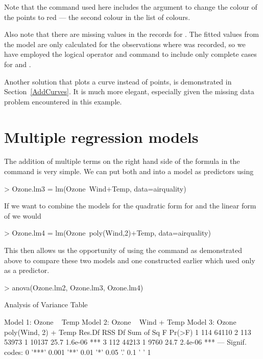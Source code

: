Note that the  command used here includes the  argument to change the colour of the points to red --- the second colour in the list of colours. 

Also note that there are missing values in the records for . The fitted values from the model are only calculated for the observations where  was recorded, so we have employed the \Rcmd{!} logical operator and  command to include only complete cases for  and .

Another solution that plots a curve instead of points, is demonstrated in Section~\ref{AddCurves}. It is much more elegant, especially given the missing data problem encountered in this example.



\section{Multiple regression models}

The addition of multiple terms on the right hand side of the formula in the  command is very simple. We can put both  and  into a model as predictors using
\begin{Schunk}
\begin{Sinput}
> Ozone.lm3 = lm(Ozone~Wind+Temp, data=airquality)
\end{Sinput}
\end{Schunk}
If we want to combine the models for the quadratic form for  and the linear form of  we would
\begin{Schunk}
\begin{Sinput}
> Ozone.lm4 = lm(Ozone~poly(Wind,2)+Temp, data=airquality)
\end{Sinput}
\end{Schunk}
This then allows us the opportunity of using the  command as demonstrated above to compare these two models and one constructed earlier which used only  as a predictor.
\begin{Schunk}
\begin{Sinput}
> anova(Ozone.lm2, Ozone.lm3, Ozone.lm4)
\end{Sinput}
\begin{Soutput}
Analysis of Variance Table

Model 1: Ozone ~ Temp
Model 2: Ozone ~ Wind + Temp
Model 3: Ozone ~ poly(Wind, 2) + Temp
  Res.Df   RSS Df Sum of Sq    F  Pr(>F)    
1    114 64110                              
2    113 53973  1     10137 25.7 1.6e-06 ***
3    112 44213  1      9760 24.7 2.4e-06 ***
---
Signif. codes:  
0 '***' 0.001 '**' 0.01 '*' 0.05 '.' 0.1 ' ' 1
\end{Soutput}
\end{Schunk}

